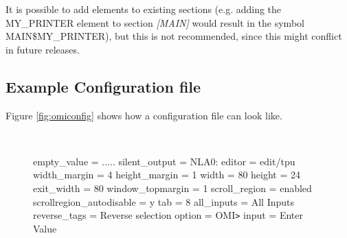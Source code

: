\documentclass[a4paper]{book}
\newcommand{\vs}{\vspace{3mm}}
\newcommand{\gt}{\texttt{>}}
\renewcommand{\indent}{\hspace*{5mm}}
\begin{document}
\vs

It is possible to add elements to existing sections (e.g. adding the 
\linebreak MY{\_}PRINTER element to section \textsl{[MAIN]} would 
result in the symbol \linebreak MAIN{\$}MY{\_}PRINTER), but this is not recommended,
since this might conflict in future releases.

\subsection{Example Configuration file}
\label{subsubsec:example}

Figure \ref{fig:omiconfig} shows how a configuration file can look like.

\begin{figure}[h!tb]
\begin{minipage}[h!tb]{\textwidth}
\hrulefill \\
\begin{ttfamily}
\noindent[main] \newline
\indent empty{\_}value = ..... \newline
\indent silent{\_}output = NLA0: \newline
\indent editor = edit/tpu \newline
 \newline
\noindent[screen] \newline
\indent width{\_}margin = 4 \newline
\indent height{\_}margin = 1 \newline
\indent width = 80 \newline
\indent height = 24 \newline
\indent exit{\_}width = 80 \newline
\indent window{\_}topmargin = 1 \newline
\indent scroll{\_}region = enabled \newline
\indent scrollregion{\_}autodisable = y \newline
\indent tab = 8 \newline
 \newline
\noindent[questions] \newline
\indent all{\_}inputs = All Inputs \newline
\indent reverse{\_}tags = Reverse selection \newline
\indent option = OMI\gt  \newline
\indent input = Enter Value \newline

\end{ttfamily}
\end{minipage}
\end{figure}
\end{document}
